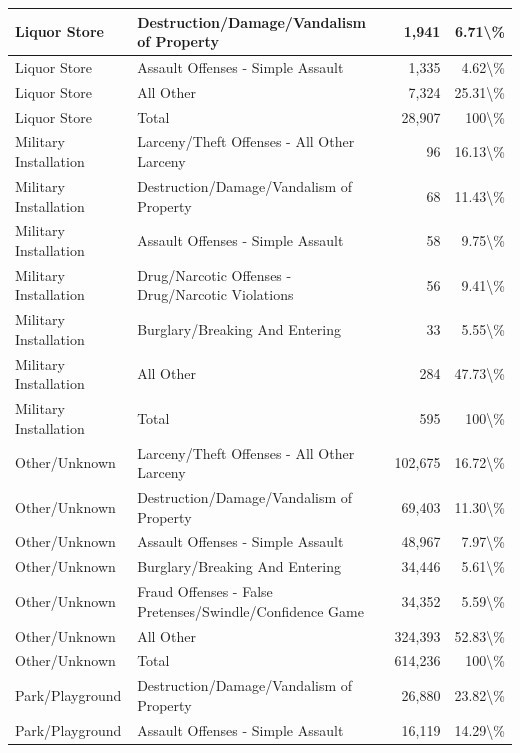 \documentclass[
]{krantz}
\begin{document}
\begin{longtable}[t]{l|l|r|r}
\hline
Liquor Store & Destruction/Damage/Vandalism of Property & 1,941 & 6.71\textbackslash{}\%\\
\hline
Liquor Store & Assault Offenses - Simple Assault & 1,335 & 4.62\textbackslash{}\%\\
\hline
Liquor Store & All Other & 7,324 & 25.31\textbackslash{}\%\\
\hline
Liquor Store & Total & 28,907 & 100\textbackslash{}\%\\
\hline
Military Installation & Larceny/Theft Offenses - All Other Larceny & 96 & 16.13\textbackslash{}\%\\
\hline
Military Installation & Destruction/Damage/Vandalism of Property & 68 & 11.43\textbackslash{}\%\\
\hline
Military Installation & Assault Offenses - Simple Assault & 58 & 9.75\textbackslash{}\%\\
\hline
Military Installation & Drug/Narcotic Offenses - Drug/Narcotic Violations & 56 & 9.41\textbackslash{}\%\\
\hline
Military Installation & Burglary/Breaking And Entering & 33 & 5.55\textbackslash{}\%\\
\hline
Military Installation & All Other & 284 & 47.73\textbackslash{}\%\\
\hline
Military Installation & Total & 595 & 100\textbackslash{}\%\\
\hline
Other/Unknown & Larceny/Theft Offenses - All Other Larceny & 102,675 & 16.72\textbackslash{}\%\\
\hline
Other/Unknown & Destruction/Damage/Vandalism of Property & 69,403 & 11.30\textbackslash{}\%\\
\hline
Other/Unknown & Assault Offenses - Simple Assault & 48,967 & 7.97\textbackslash{}\%\\
\hline
Other/Unknown & Burglary/Breaking And Entering & 34,446 & 5.61\textbackslash{}\%\\
\hline
Other/Unknown & Fraud Offenses - False Pretenses/Swindle/Confidence Game & 34,352 & 5.59\textbackslash{}\%\\
\hline
Other/Unknown & All Other & 324,393 & 52.83\textbackslash{}\%\\
\hline
Other/Unknown & Total & 614,236 & 100\textbackslash{}\%\\
\hline
Park/Playground & Destruction/Damage/Vandalism of Property & 26,880 & 23.82\textbackslash{}\%\\
\hline
Park/Playground & Assault Offenses - Simple Assault & 16,119 & 14.29\textbackslash{}\%\\

\end{longtable}
\end{document}
